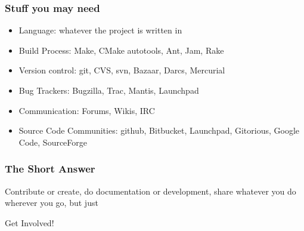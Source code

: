 \documentclass{beamer}
\begin{document}
\begin{frame}
  \frametitle{Stuff you may need}
    \begin{itemize}[<+->]
    \item Language: whatever the project is written in
    \item Build Process: Make, CMake autotools, Ant, Jam, Rake
    \item Version control: git, CVS, svn, Bazaar, Darcs, Mercurial
    \item Bug Trackers: Bugzilla, Trac, Mantis, Launchpad
    \item Communication: Forums, Wikis, IRC
    \item Source Code Communities: github, Bitbucket, Launchpad,
      Gitorious, Google Code, SourceForge
    \end{itemize}
    
    \begin{center}
    \end{center}
\end{frame}

\begin{frame}
  \frametitle{The Short Answer}
  \begin{center}
    \begin{Large}
      \textcolor{beamer@myblue}{Contribute} or \textcolor{beamer@myblue}{create}, do \textcolor{beamer@mygreen}{documentation} or \textcolor{beamer@mygreen}{development}, \textcolor{beamer@mygrey}{share} whatever you do wherever you go, but just
    \end{Large}

    \vspace{1em}

    \begin{Huge}
      Get Involved!
    \end{Huge}
  \end{center}
\end{frame}

\end{document}
